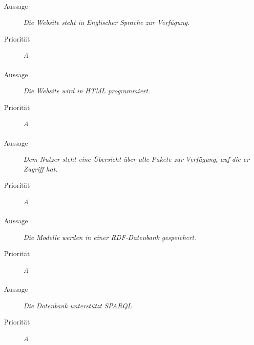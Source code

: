 \paragraph{}
\begin{description}
\item[Aussage] \textit{Die Website steht in Englischer Sprache zur Verfügung.}
\item[Priorität] \textit{A}
\end{description}

\paragraph{}
\begin{description}
\item[Aussage] \textit{Die Website wird in HTML programmiert.}
\item[Priorität] \textit{A}
\end{description}

\paragraph{}
\begin{description}
\item[Aussage] \textit{Dem Nutzer steht eine Übersicht über alle Pakete zur Verfügung, auf die er Zugriff hat.}
\item[Priorität] \textit{A}
\end{description}



\paragraph{}
\begin{description}
\item [Aussage] \textit{Die Modelle werden in einer RDF-Datenbank gespeichert.}
\item [Priorität] \textit{A}
\end{description}

\paragraph{}
\begin{description}
\item[Aussage] \textit{Die Datenbank unterstützt SPARQL}
\item[Priorität] \textit{A}
\end{description}

